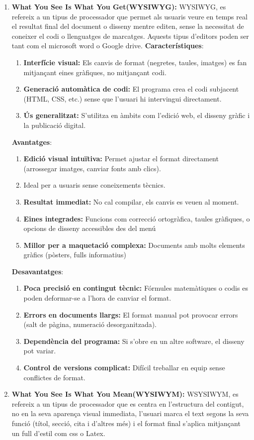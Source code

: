  \begin{enumerate}
  \item \textbf{What You See Is What You Get(WYSIWYG):} WYSIWYG, es refereix a un tipus de processador que permet als usuaris veure en temps real el resultat final del document o disseny mentre editen, sense la necessitat de coneixer el codi o llenguatges de marcatges. Aquests tipus d'editors poden ser tant com el microsoft word o Google drive.
  \textbf{Característiques}:
    \begin{enumerate}
     \item \textbf{Interfície visual:} Els canvis de format (negretes, taules, imatges) es fan mitjançant eines gràfiques, no mitjançant codi.
     \item \textbf{Generació automàtica de codi:} El programa crea el codi subjacent (HTML, CSS, etc.) sense que l'usuari hi intervingui directament.
     \item \textbf{Ús generalitzat:} S'utilitza en àmbits com l'edició web, el disseny gràfic i la publicació digital.
    \end{enumerate}

  \textbf{Avantatges}:
    \begin{enumerate}
     \item \textbf{Edició visual intuïtiva:} Permet ajustar el format directament (arrossegar imatges, canviar fonts amb clics).
     \item Ideal per a usuaris sense coneixements tècnics.
     \item \textbf{Resultat immediat:} No cal compilar, els canvis es veuen al moment.
     \item \textbf{Eines integrades:} Funcions com correcció ortogràfica, taules gràfiques, o opcions de disseny accessibles des del menú
     \item \textbf{Millor per a maquetació complexa:} Documents amb molts elements gràfics (pòsters, fulls informatius)
    \end{enumerate}

  \textbf{Desavantatges}:
    \begin{enumerate}
      \item \textbf{Poca precisió en contingut tècnic:} Fórmules matemàtiques o codis es poden deformar-se a l'hora de canviar el format.
     \item \textbf{Errors en documents llargs:} El format manual pot provocar errors (salt de pàgina, numeració desorganitzada).
     \item \textbf{Dependència del programa:} Si s'obre en un altre software, el disseny pot variar.
     \item \textbf{Control de versions complicat:} Difícil treballar en equip sense conflictes de format.
    \end{enumerate}
 \item \textbf{What You See Is What You Mean(WYSIWYM):}\label{subsec:4.2.2} WSYSIWYM, es refereix a un tipus de processador que es centra en l'estructura del contigut, no en la seva aparença visual immediata, l'usuari marca el text segons la seva funció (títol, secció, cita i d'altres més) i el format final s'aplica mitjançant un full d'estil com css o Latex.


\end{enumerate}
